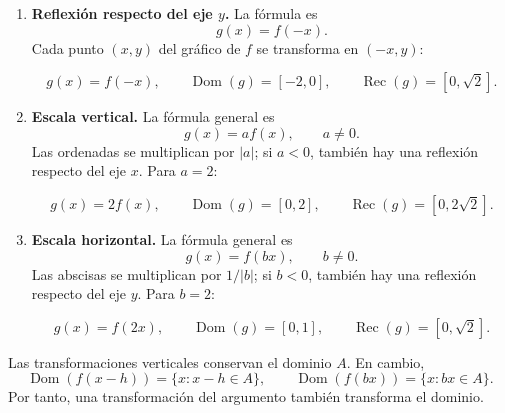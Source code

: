 \documentclass[10pt,a5paper]{article}
\begin{document}
\begin{proposicion}[de transformación]
\begin{enumerate}
\item \textbf{Reflexión respecto del eje $y$.} La fórmula es
\[
g(x)=f(-x).
\]
Cada punto $(x,y)$ del gráfico de $f$ se transforma en $(-x,y)$:
\begin{center}
\[
g(x)=f(-x),\qquad
\operatorname{Dom}(g)=[-2,0],\qquad
\operatorname{Rec}(g)=[0,\sqrt2].
\]
\end{center}

\item \textbf{Escala vertical.} La fórmula general es
\[
g(x)=a f(x),\qquad a\neq0.
\]
Las ordenadas se multiplican por $|a|$; si $a<0$, también hay una reflexión respecto del eje $x$. Para $a=2$:
\begin{center}
\[
g(x)=2f(x),\qquad
\operatorname{Dom}(g)=[0,2],\qquad
\operatorname{Rec}(g)=[0,2\sqrt2].
\]
\end{center}

\item \textbf{Escala horizontal.} La fórmula general es
\[
g(x)=f(bx),\qquad b\neq0.
\]
Las abscisas se multiplican por $1/|b|$; si $b<0$, también hay una reflexión respecto del eje $y$. Para $b=2$:
\begin{center}
\[
g(x)=f(2x),\qquad
\operatorname{Dom}(g)=[0,1],\qquad
\operatorname{Rec}(g)=[0,\sqrt2].
\]
\end{center}
\end{enumerate}

Las transformaciones verticales conservan el dominio $A$. En cambio,
\[
\operatorname{Dom}(f(x-h))=\{x:x-h\in A\},\qquad
\operatorname{Dom}(f(bx))=\{x:bx\in A\}.
\]
Por tanto, una transformación del argumento también transforma el dominio.
\end{proposicion}
\end{document}
